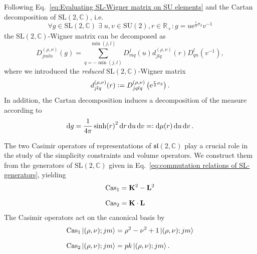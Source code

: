 \documentclass[11pt,a4paper]{article}
\newcommand{\R}{\mathbb R}
\newcommand{\C}{\mathbb C}
\newcommand{\e}{\textrm{e}}
\newcommand{\cas}{\textrm{Cas}}     %
\newcommand{\SU}{\text{SU$(2)$}}
\newcommand{\SL}{\text{SL$(2,\C)$}}
\newcommand{\spl}{\mathfrak{sl}\left(2,\C\right)}
\newcommand{\defeq}{\vcentcolon=}
\newcommand{\eqdef}{=\vcentcolon}
\begin{document}
Following Eq.~\eqref{eq:Evaluating SL-Wigner matrix on SU elements} and the Cartan decomposition of $\SL$, i.e.
%
\begin{equation}\label{eq:Cartan decomposition of g}
\forall g\in \SL\;\exists\; u,v\in\SU,r\in \R_{+}: g = u \e^{\frac{r}{2}\sigma_3}v^{-1}
\end{equation}
%
the $\SL$-Wigner matrix can be decomposed as
%
\begin{equation}\label{eq:Cartan decomposition of SL-Wigner matrix}
D^{(\rho,\nu)}_{jmln}(g) 
=
\sum_{q = -\min(j,l)}^{\min(j,l)}D^j_{mq}(u)d^{(\rho,\nu)}_{jlq}(r)D^l_{qn}(v^{-1}),
\end{equation}
where we introduced the \textit{reduced} $\SL$-Wigner matrix
%
\begin{equation}\label{eq:definition of reduced Wigner matrix}
d^{(\rho,\nu)}_{jlq}(r) \defeq D^{(\rho,\nu)}_{jqlq}\left(\e^{\frac{r}{2}\sigma_3}\right).
\end{equation}
%
In addition, the Cartan decomposition induces a decomposition of the measure according to
%
\begin{equation}\label{eq:Cartan decomposition of Haar measure}
\dd{g} = \frac{1}{4\pi}\sinh(r)^2\dd{r}\dd{u}\dd{v} \eqdef \dd{\mu(r)}\dd{u}\dd{v}.
\end{equation}

The two Casimir operators of representations of $\spl$ play a crucial role in the study of the simplicity constraints and volume operators. We construct them from the generators of $\SL$  given in Eq.~\eqref{eq:commutation relations of SL-generators}, yielding
%
\begin{equation}
\begin{aligned}
\cas_1 & = \vb{K}^2-\vb{L}^2\\[7pt]
\cas_2 & = \vb{K}\cdot\vb{L}
\end{aligned}
\end{equation}
The Casimir operators act on the canonical basis by
%
\begin{align}
\cas_1\ket{(\rho,\nu);jm} & =  \rho^2-\nu^2+1\ket{(\rho,\nu);jm}\label{eq:definition of cas1}\\[7pt]
\cas_2\ket{(\rho,\nu);jm} & = pk\ket{(\rho,\nu);jm}\label{eq:definition of cas2}.
\end{align}
\end{document}
